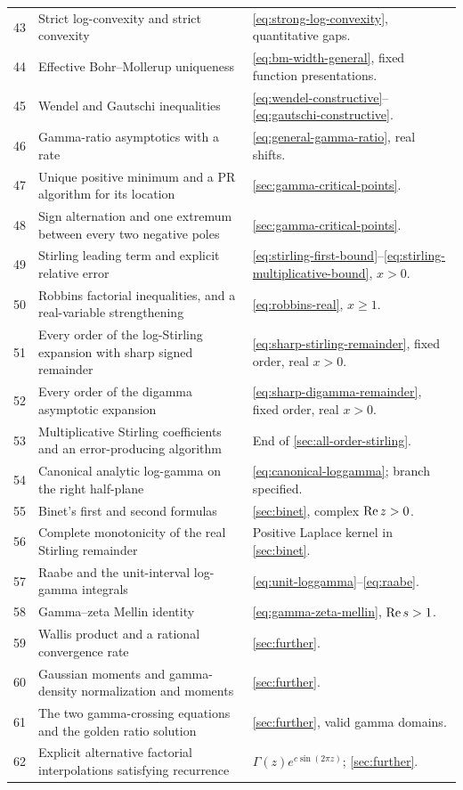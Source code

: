 \begin{longtable}{@{}r >{\raggedright\arraybackslash}p{}>{\raggedright\arraybackslash}p{}@{}}
43 & Strict log-convexity and strict convexity & \eqref{eq:strong-log-convexity}, quantitative gaps.\\
44 & Effective Bohr--Mollerup uniqueness & \eqref{eq:bm-width-general}, fixed function presentations.\\
45 & Wendel and Gautschi inequalities & \eqref{eq:wendel-constructive}--\eqref{eq:gautschi-constructive}.\\
46 & Gamma-ratio asymptotics with a rate & \eqref{eq:general-gamma-ratio}, real shifts.\\
47 & Unique positive minimum and a PR algorithm for its location & \cref{sec:gamma-critical-points}.\\
48 & Sign alternation and one extremum between every two negative poles & \cref{sec:gamma-critical-points}.\\
49 & Stirling leading term and explicit relative error & \eqref{eq:stirling-first-bound}--\eqref{eq:stirling-multiplicative-bound}, $x>0$.\\
50 & Robbins factorial inequalities, and a real-variable strengthening & \eqref{eq:robbins-real}, $x\ge1$.\\
51 & Every order of the log-Stirling expansion with sharp signed remainder & \eqref{eq:sharp-stirling-remainder}, fixed order, real $x>0$.\\
52 & Every order of the digamma asymptotic expansion & \eqref{eq:sharp-digamma-remainder}, fixed order, real $x>0$.\\
53 & Multiplicative Stirling coefficients and an error-producing algorithm & End of \cref{sec:all-order-stirling}.\\
54 & Canonical analytic log-gamma on the right half-plane & \eqref{eq:canonical-loggamma}; branch specified.\\
55 & Binet's first and second formulas & \cref{sec:binet}, complex $\operatorname{Re} z>0$.\\
56 & Complete monotonicity of the real Stirling remainder & Positive Laplace kernel in \cref{sec:binet}.\\
57 & Raabe and the unit-interval log-gamma integrals & \eqref{eq:unit-loggamma}--\eqref{eq:raabe}.\\
58 & Gamma--zeta Mellin identity & \eqref{eq:gamma-zeta-mellin}, $\operatorname{Re} s>1$.\\
59 & Wallis product and a rational convergence rate & \cref{sec:further}.\\
60 & Gaussian moments and gamma-density normalization and moments & \cref{sec:further}.\\
61 & The two gamma-crossing equations and the golden ratio solution & \cref{sec:further}, valid gamma domains.\\
62 & Explicit alternative factorial interpolations satisfying recurrence & $\Gamma(z)e^{c\sin(2\pi z)}$; \cref{sec:further}.\\
\bottomrule
\end{longtable}
\normalsize

